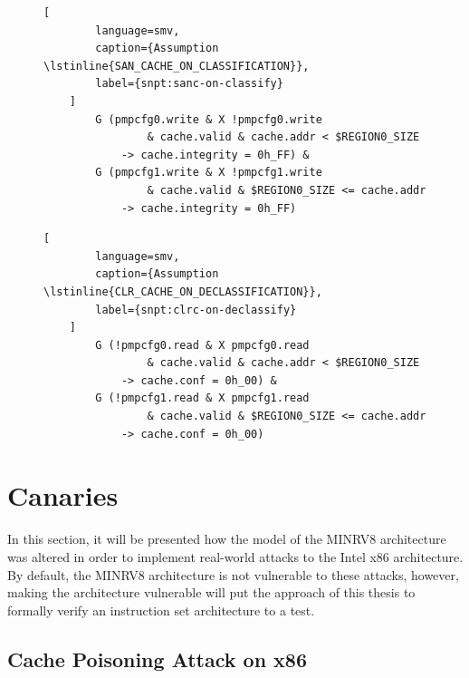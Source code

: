 \begin{figure}
    \begin{lstlisting}[
        language=smv,
        caption={Assumption \lstinline{SAN_CACHE_ON_CLASSIFICATION}},
        label={snpt:sanc-on-classify}
    ]
        G (pmpcfg0.write & X !pmpcfg0.write
                & cache.valid & cache.addr < $REGION0_SIZE
            -> cache.integrity = 0h_FF) &
        G (pmpcfg1.write & X !pmpcfg1.write
                & cache.valid & $REGION0_SIZE <= cache.addr
            -> cache.integrity = 0h_FF)
    \end{lstlisting}

    \begin{lstlisting}[
        language=smv,
        caption={Assumption \lstinline{CLR_CACHE_ON_DECLASSIFICATION}},
        label={snpt:clrc-on-declassify}
    ]
        G (!pmpcfg0.read & X pmpcfg0.read
                & cache.valid & cache.addr < $REGION0_SIZE
            -> cache.conf = 0h_00) &
        G (!pmpcfg1.read & X pmpcfg1.read
                & cache.valid & $REGION0_SIZE <= cache.addr
            -> cache.conf = 0h_00)
    \end{lstlisting}
\end{figure}

\section{Canaries}
\label{sec:canaries}

In this section, it will be presented how the model of the MINRV8 architecture was altered in order to implement real-world attacks to the Intel x86 architecture.
By default, the MINRV8 architecture is not vulnerable to these attacks, however, making the architecture vulnerable will put the approach of this thesis to formally verify an instruction set architecture to a test.

\subsection{Cache Poisoning Attack on x86}
\label{sec:cache-poisoning}

